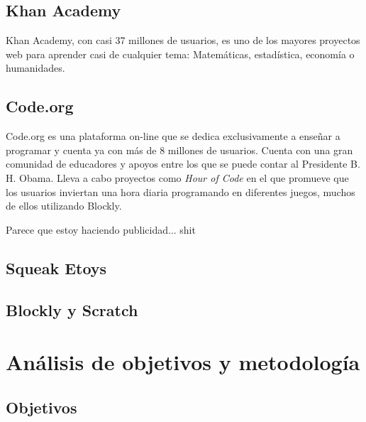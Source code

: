 \section{Khan Academy}
\label{sec:Khan Academy}

Khan Academy\cite{khan-academy}, con casi 37 millones de usuarios, es uno de los mayores proyectos web para aprender casi de cualquier tema: Matemáticas, estadística, economía o humanidades.


\section{Code.org}
\label{sec:Code.org}

Code.org\cite{code-org} es una plataforma on-line que se dedica exclusivamente a enseñar a programar y cuenta ya con más de 8 millones de usuarios. Cuenta con una gran comunidad de educadores y apoyos entre los que se puede contar al Presidente B. H. Obama. Lleva a cabo proyectos como \emph{Hour of Code} en el que promueve que los usuarios inviertan una hora diaria programando en diferentes juegos, muchos de ellos utilizando \Gls{Blockly}\cite{blockly}.

{\color{red} Parece que estoy haciendo publicidad... shit}


\section{Squeak Etoys}
\label{sec:squeak-etoys}


\section{Blockly y Scratch}
\label{sec:blockly-scratch}


\chapter{Análisis de objetivos y metodología}\label{objetivos-metodologia}

\section{Objetivos}
\label{sec:Objetivos}

